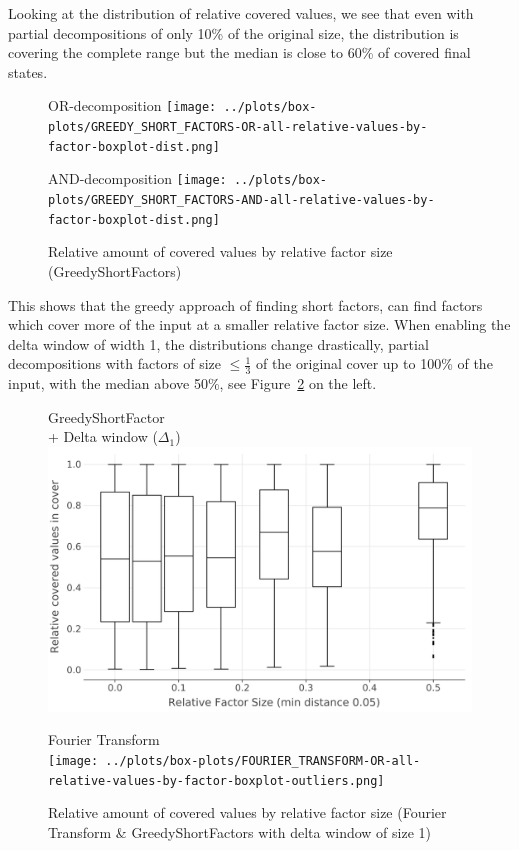 Looking at the distribution of relative covered values, we see that even with partial decompositions of only 10\% of the original size, the distribution is covering the complete range but the median is close to 60\% of covered final states.
\begin{figure}[t]
	\begin{minipage}[h]{0.49\linewidth}
		\centering
		OR-decomposition
		\texttt{[image: ../plots/box-plots/GREEDY\_SHORT\_FACTORS-OR-all-relative-values-by-factor-boxplot-dist.png]}
	\end{minipage}
	\begin{minipage}[h]{0.49\linewidth}
		\centering
		AND-decomposition
		\texttt{[image: ../plots/box-plots/GREEDY\_SHORT\_FACTORS-AND-all-relative-values-by-factor-boxplot-dist.png]}
	\end{minipage}
	\caption{Relative amount of covered values by relative factor size (GreedyShortFactors)}
	\label{fig:eval:greedy-short-factors-all-factors-box-plot}
\end{figure}
This shows that the greedy approach of finding short factors, can find factors which cover more of the input at a smaller relative factor size.
When enabling the delta window of width 1, the distributions change drastically, partial decompositions with factors of size $\leq \frac{1}{3}$ of the original \DFA cover up to 100\% of the input, with the median above 50\%, see Figure~\ref{fig:eval:greedy-short-factors-all-factors-box-plot-delta} on the left.
\begin{figure}[h]
	\begin{minipage}[h]{0.49\linewidth}
		\centering
		GreedyShortFactor\\
		+ Delta window ($\Delta_1$)
		\includegraphics[width=\linewidth]{../delta-plots/box-plots/GREEDY_SHORT_FACTORS-OR-all-relative-values-by-factor-boxplot-dist.png}
	\end{minipage}
	\begin{minipage}[h]{0.49\linewidth}
		\centering
		Fourier Transform\\
		\hfill \break
		\texttt{[image: ../plots/box-plots/FOURIER\_TRANSFORM-OR-all-relative-values-by-factor-boxplot-outliers.png]}
	\end{minipage}
	\caption{Relative amount of covered values by relative factor size (Fourier Transform \& GreedyShortFactors with delta window of size 1)}
	\label{fig:eval:greedy-short-factors-all-factors-box-plot-delta}
\end{figure}
